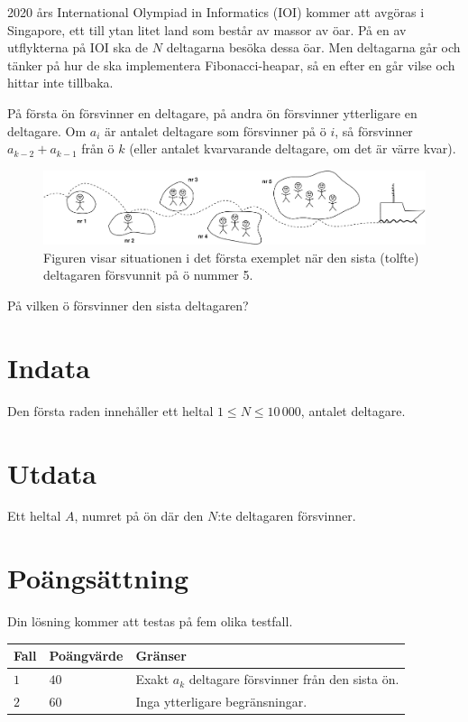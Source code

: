 2020 års International Olympiad in Informatics (IOI) kommer att avgöras i Singapore, ett till ytan litet land som består av massor av öar.
På en av utflykterna på IOI ska de $N$ deltagarna besöka dessa öar.
Men deltagarna går och tänker på hur de ska implementera Fibonacci-heapar, så en efter en går vilse och hittar inte tillbaka.

På första ön försvinner en deltagare, på andra ön försvinner ytterligare en deltagare.
Om $a_i$ är antalet deltagare som försvinner på ö $i$, så försvinner $a_{k-2} + a_{k-1}$ från ö $k$ (eller antalet kvarvarande deltagare, om det är värre kvar).

\begin{figure}[h]
  \centering
      \includegraphics[width=1.0\textwidth]{oarfig}
      \caption{Figuren visar situationen i det första exemplet när den sista (tolfte) deltagaren försvunnit på ö nummer 5.}
\end{figure}

På vilken ö försvinner den sista deltagaren?

\section*{Indata}
Den första raden innehåller ett heltal $1\le N \le 10\,000$, antalet deltagare.

\section*{Utdata}
Ett heltal $A$, numret på ön där den $N$:te deltagaren försvinner.

\section*{Poängsättning}
Din lösning kommer att testas på fem olika testfall.

\noindent
\begin{tabular}{| l | l | l |}
  \hline
  Fall & Poängvärde & Gränser \\ \hline
  $1$    & $40$        &  Exakt $a_k$ deltagare försvinner från den sista ön. \\ \hline 
  $2$    & $60$        &  Inga ytterligare begränsningar. \\ \hline
\end{tabular}
